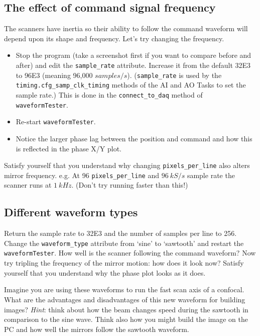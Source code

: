 \documentclass[a4paper]{report}
\begin{document}
\clearpage
\subsection{The effect of command signal frequency}
The scanners have inertia so their ability to follow the command waveform will depend upon its shape and frequency. 
Let's try changing the frequency. 

\begin{itemize}
\item Stop the program (take a screenshot first if you want to compare before and after) and edit the \texttt{sample\_rate} attribute.
Increase it from the default 32E3 to 96E3 (meaning 96,000 $samples/s$). 
(\texttt{sample\_rate} is used by the \texttt{timing.cfg\_samp\_clk\_timing} methods of the AI and AO Tasks to set the sample rate.)
This is done in the \texttt{connect\_to\_daq} method of \texttt{waveformTester}.
\item Re-start \texttt{waveformTester}.
\item Notice the larger phase lag between the position and command and how this is reflected in the phase X/Y plot. 
\end{itemize}

\noindent
Satisfy yourself that you understand why changing \texttt{pixels\_per\_line} also alters mirror frequency. 
e.g. At 96 \texttt{pixels\_per\_line} and $96~kS/s$ sample rate the scanner runs at $1~kHz$. (Don't try running faster than this!)


\subsection{Different waveform types}
Return the sample rate to 32E3 and the number of samples per line to 256. 
Change the \texttt{waveform\_type} attribute from `sine' to `sawtooth' and restart the \texttt{waveformTester}. 
How well is the scanner following the command waveform?
Now try tripling the frequency of the mirror motion: how does it look now?
Satisfy yourself that you understand why the phase plot looks as it does. 

Imagine you are using these waveforms to run the fast scan axis of a confocal. 
What are the advantages and disadvantages of this new waveform for building images?
\emph{Hint}: think about how the beam changes speed during the sawtooth in comparison to the sine wave.
Think also how you might build the image on the PC and how well the mirrors follow the sawtooth waveform.
\vspace{1em}
\end{document}
